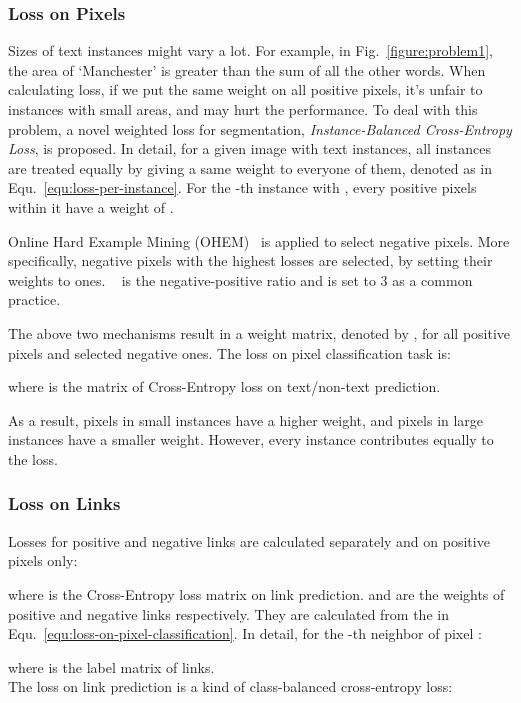 \documentclass[letterpaper]{article} \usepackage{aaai18}  \usepackage{times}  \usepackage{helvet}  \usepackage{courier}  \usepackage{url}  \usepackage{graphicx}
\begin{document}
	\subsubsection{Loss on Pixels}
	Sizes of text instances might vary a lot. For example, in Fig.~\ref{figure:problem1}, the area of `Manchester' is greater than the sum of all the other words. When calculating loss, if we put the same weight on all positive pixels, it's unfair to instances with small areas, and may hurt the performance. To deal with this problem, a novel weighted loss for segmentation, \emph{Instance-Balanced Cross-Entropy Loss}, is proposed.
	In detail, for a given image with  text instances, all instances are treated equally by giving a same weight to everyone of them, denoted as  in Equ.~\ref{equ:loss-per-instance}. For the -th instance with , every positive pixels within it have a weight of .
	
	
	
	Online Hard Example Mining (OHEM)~\cite{Shrivastava2016OHEM} is applied to select negative pixels. More specifically,  negative pixels with the highest losses are selected, by setting their weights to ones. ~ is the negative-positive ratio and is set to 3 as a common practice.
	
	The above two mechanisms result in a weight matrix, denoted by , for all positive pixels and selected negative ones. The loss on pixel classification task is:
	
	where  is the matrix of Cross-Entropy loss on text/non-text prediction.
	
	As a result, pixels in small instances have a higher weight, and pixels in large instances have a smaller weight. However, every instance contributes equally to the loss.
	
	\subsubsection{Loss on Links}
	Losses for positive and negative links are calculated separately and on positive pixels only:
	
	
	where  is the Cross-Entropy loss matrix on link prediction.   and  are the weights of positive and negative links respectively. They are calculated from the  in Equ.~\ref{equ:loss-on-pixel-classification}.
	In detail, for the -th neighbor of pixel :
	
	
	where  is the label matrix of links.\\
	
	The loss on link prediction is a kind of class-balanced cross-entropy loss:
	
\end{document}
